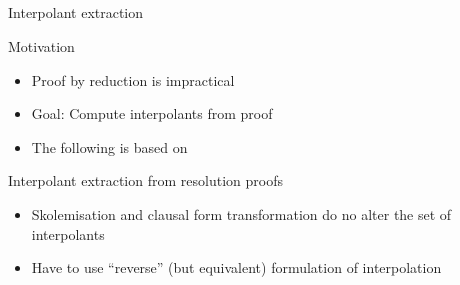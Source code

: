 \documentclass[final,compress]{beamer}
\begin{document}
\subsection{}
\begin{frame}{Interpolant extraction}
	\begin{block}{Motivation}
		\begin{itemize}
			\item Proof by reduction is impractical
			\item Goal: Compute interpolants from proof
			\item The following is based on \cite{Huang95}
		\end{itemize}
	\end{block}
	\pause
	\begin{block}{Interpolant extraction from resolution proofs}
		\begin{itemize}
			\item Skolemisation and clausal form transformation do no alter the set of interpolants
			\item Have to use ``reverse'' (but equivalent) formulation of interpolation
		\end{itemize}
	\end{block}

\end{frame}
\newcommand{\fakemulticolwidth}{0.28\textwidth}
	\newcommand{\proofwidth}{0.18\textwidth}
	\newcommand{\proofindent}{\hspace*{11.21em}}

	\newcommand{\stagearrow}{{\Large$\Downarrow$}}
\end{document}
